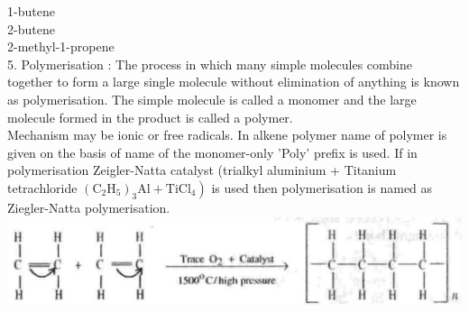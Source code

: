 \documentclass[10pt]{article}
\begin{document}
1-butene\\
2-butene\\
2-methyl-1-propene\\
5. Polymerisation : The process in which many simple molecules combine together to form a large single molecule without elimination of anything is known as polymerisation. The simple molecule is called a monomer and the large molecule formed in the product is called a polymer.\\
Mechanism may be ionic or free radicals. In alkene polymer name of polymer is given on the basis of name of the monomer-only 'Poly' prefix is used. If in polymerisation Zeigler-Natta catalyst (trialkyl aluminium + Titanium tetrachloride $\left.\left(\mathrm{C}_{2} \mathrm{H}_{5}\right)_{3} \mathrm{Al}+\mathrm{TiCl}_{4}\right)$ is used then polymerisation is named as Ziegler-Natta polymerisation.\\
\includegraphics[max width=\textwidth, center]{2025_01_28_8470952b98110cec3aabg-185(4)}
\end{document}
